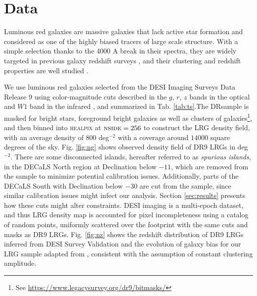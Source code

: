\section{Data}
\label{sec:data}
Luminous red galaxies are massive galaxies that lack active star formation and considered as one of the highly biased tracers of large scale structure. With a simple selection thanks to the 4000 A break in their spectra, they are widely targeted in previous galaxy redshift surveys , and their clustering and redshift properties are well studied . 

We use luminous red galaxies selected from the DESI Imaging Surveys Data Release 9 \citep{dey2018overview} using color-magnitude cuts described in the $g$, $r$, $z$ bands in the optical and $W1$ band in the infrared \citep[see,][]{zhou2021clustering}, and summarized in Tab. \ref{tab:ts}.The DRsample is masked for bright stars, foreground bright galaxies as well as clusters of galaxies\footnote{See \url{https://www.legacysurvey.org/dr9/bitmasks/}}, and then binned into \textsc{healpix} \citep{gorski2005healpix} at $\textsc{nside}=256$ to construct the LRG density field, with an average density of $800$ deg$^{-2}$ with a coverage around $14000$ square degrees of the sky. Fig. \ref{fig:ng} shows observed density field of DR9 LRGs in deg$^{-2}$. There are some disconnected islands, hereafter referred to as \textit{spurious islands}, in the DECaLS North region at Declination below $-11$, which are removed from the sample to minimize potential calibration issues. Additionally, parts of the DECaLS South with Declination below $-30$ are cut from the sample, since similar calibration issues might infect our analysis. Section \ref{sec:results} presents how these cuts might alter constraints. DESI imaging is a multi-epoch dataset, and thus LRG density map is accounted for pixel incompleteness using a catalog of random points, uniformly scattered over the footprint with the same cuts and masks as DR9 LRGs. Fig. \ref{fig:nz} shows the redshift distribution of DR9 LRGs inferred from DESI Survey Validation  and the evolution of  galaxy bias for our LRG sample adapted from \cite{zhou2021clustering}, consistent with the assumption of constant clustering amplitude. 

